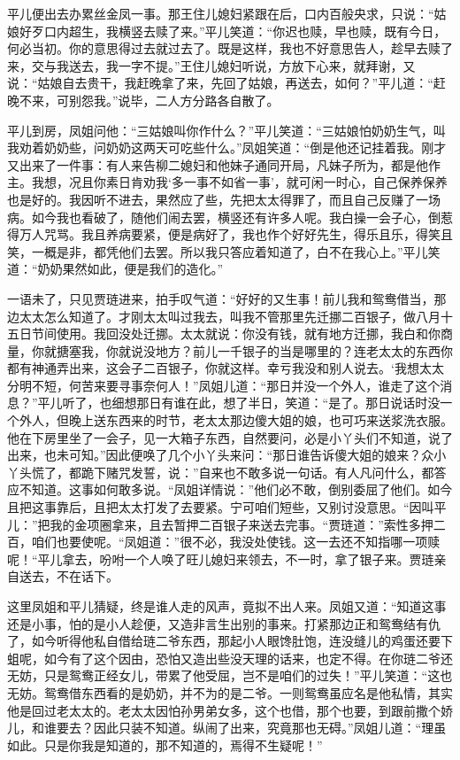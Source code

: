 \documentclass[12pt,oneside]{book}
\begin{document}
平儿便出去办累丝金凤一事。那王住儿媳妇紧跟在后，口内百般央求，只说：“姑娘好歹口内超生，我横竖去赎了来。”平儿笑道：“你迟也赎，早也赎，既有今日，何必当初。你的意思得过去就过去了。既是这样，我也不好意思告人，趁早去赎了来，交与我送去，我一字不提。”王住儿媳妇听说，方放下心来，就拜谢，又说：“姑娘自去贵干，我赶晚拿了来，先回了姑娘，再送去，如何？”平儿道：“赶晚不来，可别怨我。”说毕，二人方分路各自散了。

平儿到房，凤姐问他：“三姑娘叫你作什么？”平儿笑道：“三姑娘怕奶奶生气，叫我劝着奶奶些，问奶奶这两天可吃些什么。”凤姐笑道：“倒是他还记挂着我。刚才又出来了一件事：有人来告柳二媳妇和他妹子通同开局，凡妹子所为，都是他作主。我想，况且你素日肯劝我‘多一事不如省一事’，就可闲一时心，自己保养保养也是好的。我因听不进去，果然应了些，先把太太得罪了，而且自己反赚了一场病。如今我也看破了，随他们闹去罢，横竖还有许多人呢。我白操一会子心，倒惹得万人咒骂。我且养病要紧，便是病好了，我也作个好好先生，得乐且乐，得笑且笑，一概是非，都凭他们去罢。所以我只答应着知道了，白不在我心上。”平儿笑道：“奶奶果然如此，便是我们的造化。”

一语未了，只见贾琏进来，拍手叹气道：“好好的又生事！前儿我和鸳鸯借当，那边太太怎么知道了。才刚太太叫过我去，叫我不管那里先迁挪二百银子，做八月十五日节间使用。我回没处迁挪。太太就说：你没有钱，就有地方迁挪，我白和你商量，你就搪塞我，你就说没地方？前儿一千银子的当是哪里的？连老太太的东西你都有神通弄出来，这会子二百银子，你就这样。幸亏我没和别人说去。‘我想太太分明不短，何苦来要寻事奈何人！”凤姐儿道：“那日并没一个外人，谁走了这个消息？”平儿听了，也细想那日有谁在此，想了半日，笑道：“是了。那日说话时没一个外人，但晚上送东西来的时节，老太太那边傻大姐的娘，也可巧来送浆洗衣服。他在下房里坐了一会子，见一大箱子东西，自然要问，必是小丫头们不知道，说了出来，也未可知。”因此便唤了几个小丫头来问：“那日谁告诉傻大姐的娘来？众小丫头慌了，都跪下赌咒发誓，说：”自来也不敢多说一句话。有人凡问什么，都答应不知道。这事如何敢多说。“凤姐详情说：”他们必不敢，倒别委屈了他们。如今且把这事靠后，且把太太打发了去要紧。宁可咱们短些，又别讨没意思。“因叫平儿：”把我的金项圈拿来，且去暂押二百银子来送去完事。“贾琏道：”索性多押二百，咱们也要使呢。“凤姐道：”很不必，我没处使钱。这一去还不知指哪一项赎呢！“平儿拿去，吩咐一个人唤了旺儿媳妇来领去，不一时，拿了银子来。贾琏亲自送去，不在话下。

这里凤姐和平儿猜疑，终是谁人走的风声，竟拟不出人来。凤姐又道：“知道这事还是小事，怕的是小人趁便，又造非言生出别的事来。打紧那边正和鸳鸯结有仇了，如今听得他私自借给琏二爷东西，那起小人眼馋肚饱，连没缝儿的鸡蛋还要下蛆呢，如今有了这个因由，恐怕又造出些没天理的话来，也定不得。在你琏二爷还无妨，只是鸳鸯正经女儿，带累了他受屈，岂不是咱们的过失！”平儿笑道：“这也无妨。鸳鸯借东西看的是奶奶，并不为的是二爷。一则鸳鸯虽应名是他私情，其实他是回过老太太的。老太太因怕孙男弟女多，这个也借，那个也要，到跟前撒个娇儿，和谁要去？因此只装不知道。纵闹了出来，究竟那也无碍。”凤姐儿道：“理虽如此。只是你我是知道的，那不知道的，焉得不生疑呢！”
\end{document}

